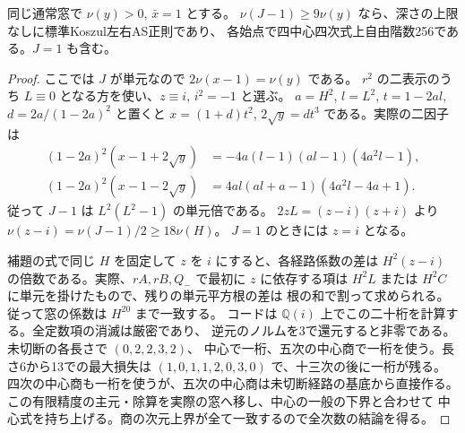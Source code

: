 \begin{theorem}\label{thm:rank-fifteen-collision-tube}
同じ通常窓で $\nu(y)>0$, $\bar x=1$ とする。
$\nu(J-1)\ge9\nu(y)$ なら、深さの上限なしに標準Koszul左右AS正則であり、
各始点で四中心四次式上自由階数256である。$J=1$ も含む。
\end{theorem}
\begin{proof}
ここでは $J$ が単元なので $2\nu(x-1)=\nu(y)$ である。
$r^2$ の二表示のうち $L\equiv0$ となる方を使い、$z\equiv i$, $i^2=-1$ と選ぶ。
$a=H^2$, $l=L^2$, $t=1-2al$, $d=2a/(1-2a)^2$ と置くと
$x=(1+d)t^2$, $2\sqrt y=dt^3$ である。実際の二因子は
\[
\begin{aligned}
(1-2a)^2(x-1+2\sqrt y)&=-4a(l-1)(al-1)(4a^2l-1),\\
(1-2a)^2(x-1-2\sqrt y)&=4al(al+a-1)(4a^2l-4a+1).
\end{aligned}
\]
従って $J-1$ は $L^2(L^2-1)$ の単元倍である。
$2zL=(z-i)(z+i)$ より $\nu(z-i)=\nu(J-1)/2\ge18\nu(H)$。
$J=1$ のときには $z=i$ となる。

補題の式で同じ $H$ を固定して $z$ を $i$ にすると、各経路係数の差は
$H^2(z-i)$ の倍数である。実際、$rA,rB,Q_-$ で最初に $z$ に依存する項は
$H^2 L$ または $H^2 C$ に単元を掛けたもので、残りの単元平方根の差は
根の和で割って求められる。従って窓の係数は $H^{20}$ まで一致する。
コードは $\mathbb Q(i)$ 上でこの二十桁を計算する。全定数項の消滅は厳密であり、
逆元のノルムを3で還元すると非零である。未切断の各長さで $(0,2,2,3,2)$、
中心で一桁、五次の中心商で一桁を使う。長さ6から13での最大損失は
$(1,0,1,1,2,0,3,0)$ で、十三次の後に一桁が残る。
四次の中心商も一桁を使うが、五次の中心商は未切断経路の基底から直接作る。
この有限精度の主元・除算を実際の窓へ移し、中心の一般の下界と合わせて
中心式を持ち上げる。商の次元上界が全て一致するので全次数の結論を得る。
\end{proof}
